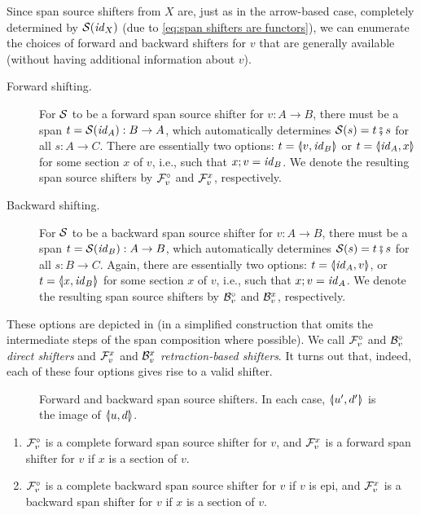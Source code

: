 Since span source shifters from $X$ are, just as in the arrow-based case, completely determined by $\cS(\id_X)$ (due to \eqref{eq:span shifters are functors}), we can enumerate the choices of forward and backward shifters for $v$ that are generally available (without having additional information about $v$).
%
\begin{description}
\item[Forward shifting.] For $\cS$ to be a forward span source shifter for $v:A\to B$, there must be a span $t=\cS(\id_A):B\to A$, which automatically determines $\cS(s)=t\spcomp s$ for all $s:A\to C$. There are essentially two options: $t=\spanof{v}{\id_B}$ or $t=\spanof{\id_A}{x}$ for some section $x$ of $v$, i.e., such that $x;v=\id_B$. We denote the resulting span source shifters by $\cF_v^\circ$ and $\cF_v^x$, respectively.

\item[Backward shifting.] For $\cS$ to be a backward span source shifter for $v:A\to B$, there must be a span $t=\cS(\id_B):A\to B$, which automatically determines $\cS(s)=t \spcomp s$ for all $s:B\to C$. Again, there are essentially two options: $t=\spanof{\id_A}{v}$, or $t=\spanof{x}{\id_B}$ for some section $x$ of $v$, i.e., such that $x;v=\id_A$. We denote the resulting span source shifters by $\cB_v^\circ$ and $\cB_v^x$, respectively.
\end{description}
%
These options are depicted in  (in a simplified construction that omits the intermediate steps of the span composition where possible). We call $\dF v$ and $\dB v$ \emph{direct shifters} and $\rF v x$ and $\rB v x$ \emph{retraction-based shifters}. It turns out that, indeed, each of these four options gives rise to a valid shifter.
%
\begin{figure}
\centering

\caption{Forward and backward span source shifters. In each case, $\spanof{u'}{d'}$ is the image of $\spanof{u}{d}$.}
\end{figure}
%
\begin{proposition}
\begin{enumerate}
\item $\cF_v^\circ$ is a complete forward span source shifter for $v$, and $\cF_v^x$ is a forward span shifter for $v$ if $x$ is a section of $v$.
\item $\cF_v^\circ$ is a complete backward span source shifter for $v$ if $v$ is epi, and $\cF_v^x$ is a backward span shifter for $v$ if $x$ is a section of $v$.
\end{enumerate}
\end{proposition}

